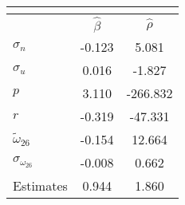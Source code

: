 \begin{tabular}{l*{2}{c}} 
\multicolumn{3}{c}{} \\ \toprule 
& $\hat{\beta}$ & $\hat{\rho}$ \\ \cmidrule(lr){2-3} 
  $\sigma_{n}$ & -0.123 & 5.081 \\ 
  $\sigma_{u}$ & 0.016 & -1.827 \\ 
  $p$ & 3.110 & -266.832 \\ 
  $r$ & -0.319 & -47.331 \\ 
  $\tilde{\omega}_{26}$ & -0.154 & 12.664 \\ 
  $\sigma_{\omega_{26}}$ & -0.008 & 0.662 \\ 
 \midrule Estimates& 0.944 & 1.860 \\ \bottomrule 
 \end{tabular}